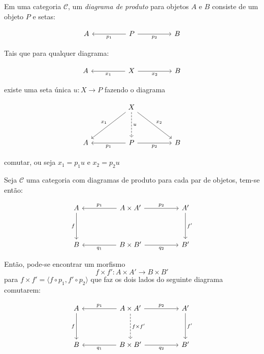 \documentclass[../main.tex]{subfiles}
\begin{document}
\begin{definition}
    Em uma categoria $\mathcal{C}$, um \emph{diagrama de produto} para objetos $A$ e $B$ consiste de um objeto $P$ e setas:

    \[\begin{tikzcd}
        A && P && B
        \arrow["{p_1}", from=1-3, to=1-1]
        \arrow["{p_2}"', from=1-3, to=1-5]
    \end{tikzcd}\]

    Tais que para qualquer diagrama:

    \[\begin{tikzcd}
        A && X && B
        \arrow["{x_1}", from=1-3, to=1-1]
        \arrow["{x_2}"', from=1-3, to=1-5]
    \end{tikzcd}\]

    existe uma seta única $u : X \to P$ fazendo o diagrama

    \[\begin{tikzcd}
        && X \\
        \\
        A && P && B
        \arrow["{x_1}"', from=1-3, to=3-1]
        \arrow["u", dashed, from=1-3, to=3-3]
        \arrow["{x_2}", from=1-3, to=3-5]
        \arrow["{p_1}", from=3-3, to=3-1]
        \arrow["{p_2}"', from=3-3, to=3-5]
    \end{tikzcd}\]

    comutar, ou seja $x_1 = p_1 u$ e $x_2 = p_2 u$
\end{definition}

Seja $\mathcal{C}$ uma categoria com diagramas de produto para cada par de objetos, tem-se então:

\[\begin{tikzcd}
	A && {A \times A'} && {A'} \\
	\\
	B && {B \times B'} && {B'}
	\arrow["f"', from=1-1, to=3-1]
	\arrow["{p_1}"', from=1-3, to=1-1]
	\arrow["{p_2}", from=1-3, to=1-5]
	\arrow["{f'}", from=1-5, to=3-5]
	\arrow["{q_1}", from=3-3, to=3-1]
	\arrow["{q_2}"', from=3-3, to=3-5]
\end{tikzcd}\]

Então, pode-se encontrar um morfismo $$f \times f' : A \times A' \to B \times B'$$ para $f \times f' = \langle f \circ p_1, f' \circ p_2 \rangle$ que faz os dois lados do seguinte diagrama comutarem:

\[\begin{tikzcd}
	A && {A \times A'} && {A'} \\
	\\
	B && {B \times B'} && {B'}
	\arrow["f"', from=1-1, to=3-1]
	\arrow["{p_1}"', from=1-3, to=1-1]
	\arrow["{p_2}", from=1-3, to=1-5]
	\arrow["{f \times f'}", dashed, from=1-3, to=3-3]
	\arrow["{f'}", from=1-5, to=3-5]
	\arrow["{q_1}", from=3-3, to=3-1]
	\arrow["{q_2}"', from=3-3, to=3-5]
\end{tikzcd}\]
\end{document}
